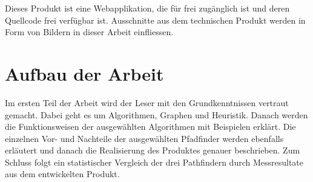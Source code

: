 Dieses Produkt ist eine Webapplikation, die für frei zugänglich ist
und deren Quellcode frei verfügbar ist. Ausschnitte aus dem technischen
Produkt werden in Form von Bildern in dieser Arbeit einfliessen.

\section{Aufbau der Arbeit}

Im ersten Teil der Arbeit wird der Leser mit den Grundkenntnissen
vertraut gemacht. Dabei geht es um Algorithmen, Graphen und Heuristik.
Danach werden die Funktionsweisen der ausgewählten Algorithmen mit Beispielen erklärt. 
Die einzelnen Vor- und Nachteile der
ausgewählten Pfadfinder werden ebenfalls erläutert und danach die
Realisierung des Produktes genauer beschrieben. Zum Schluss folgt ein
statistischer Vergleich der drei Pathfindern durch Messresultate aus dem
entwickelten Produkt.
